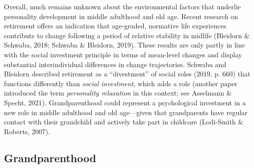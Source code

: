 \documentclass[
  english,
  man,floatsintext]{apa7}
\begin{document}
Overall, much remains unknown about the environmental factors that underlie personality development in middle adulthood and old age. Recent research on retirement offers an indication that age-graded, normative life experiences contribute to change following a period of relative stability in midlife (Bleidorn \& Schwaba, 2018; Schwaba \& Bleidorn, 2019). These results are only partly in line with the social investment principle in terms of mean-level changes and display substantial interindividual differences in change trajectories. Schwaba and Bleidorn described retirement as a \enquote{divestment} of social roles (2019, p. 660) that functions differently than \emph{social investment}, which adds a role (another paper introduced the term \emph{personality relaxation} in this context; see Asselmann \& Specht, 2021). Grandparenthood could represent a psychological investment in a new role in middle adulthood and old age---given that grandparents have regular contact with their grandchild and actively take part in childcare (Lodi-Smith \& Roberts, 2007).

\hypertarget{grandparenthood}{%
\subsection{Grandparenthood}\label{grandparenthood}}
\end{document}
